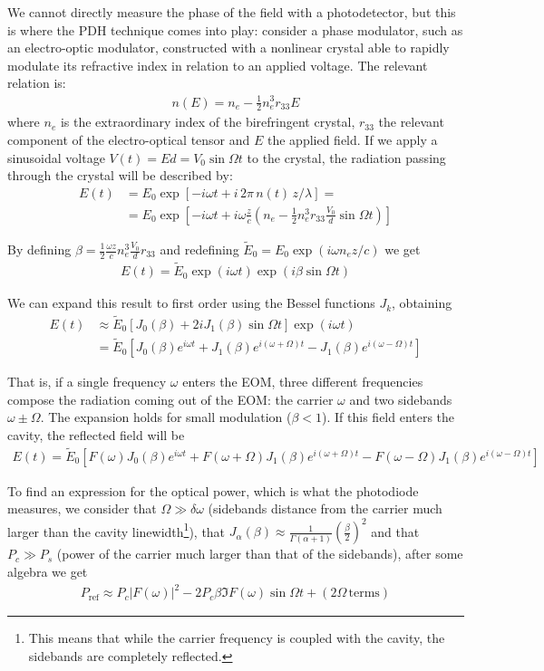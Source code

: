 We cannot directly measure the phase of the field with a photodetector, but this is where the PDH technique comes into play: consider a phase modulator, such as an electro-optic modulator, constructed with a nonlinear crystal able to rapidly modulate its refractive index in relation to an applied voltage. The relevant relation is:
\begin{align}
n(E) = n_e - \frac{1}{2}n_e^3 r_{33}E
\end{align}
where $n_e$ is the extraordinary index of the birefringent crystal, $r_{33}$ the relevant component of the electro-optical tensor and $E$ the applied field. If we apply a sinusoidal voltage $V(t) = Ed = V_0 \sin\Omega t$ to the crystal, the radiation passing through the crystal will be described by:
\begin{align}
	E(t) &=  E_0 \exp[-i\omega t + i\,2\pi\, n(t)\, z/\lambda] =\\
		&= E_0 \exp\left[-i\omega t +i\omega \frac{z}{c}(n_e - \frac{1}{2}n_e^3 r_{33}\frac{V_0}{d}\sin\Omega t) \right]
\end{align}

By defining $\beta = \frac{1}{2}\frac{\omega z}{c}n_e^3\frac{V_0}{d}r_{33}$ and redefining $\tilde E_0 = E_0 \exp(i\omega n_e z/c)$ we get
\begin{align}
E(t) = \tilde E_0 \exp(i\omega t)\exp(i\beta \sin\Omega t)
\end{align}

We can expand this result to first order using the Bessel functions $J_k$, obtaining
\begin{align}
	E(t) &\approx \tilde E_0 [J_0(\beta) + 2 i J_1(\beta) \sin\Omega t]\exp(i\omega t )\\
	&= \tilde E_0 [J_0(\beta)e^{i\omega t} + J_1(\beta)e^{i(\omega+\Omega) t} -J_1(\beta)e^{i(\omega-\Omega) t}]
\end{align}

That is, if a single frequency $\omega$ enters the EOM, three different frequencies compose the radiation coming out of the EOM: the carrier $\omega$ and two sidebands $\omega\pm\Omega$. The expansion holds for small modulation ($\beta < 1$).
If this field enters the cavity, the reflected field will be
\begin{align}
	E(t) = \tilde E_0 [F(\omega)J_0(\beta)e^{i\omega t} + F(\omega+\Omega)J_1(\beta)e^{i(\omega+\Omega) t} -F(\omega-\Omega)J_1(\beta)e^{i(\omega-\Omega) t}]
\end{align}

To find an expression for the optical power, which is what the photodiode measures, we consider that $\Omega \gg \delta\omega$ (sidebands distance from the carrier much larger than the cavity linewidth\footnote{This means that while the carrier frequency is coupled with the cavity, the sidebands are completely reflected.}), that $J_\alpha(\beta)\approx \frac{1}{\Gamma(\alpha+1)}\left(\frac{\beta}{2}\right)^2$ and that $P_c \gg P_s$ (power of the carrier much larger than that of the sidebands), after some algebra we get
\begin{align}
	P_\mathrm{ref} \approx P_c |F(\omega)|^2 -2 P_c\beta\Im{F(\omega)}\sin\Omega t + (2\Omega \,\mathrm{terms})
\end{align}

